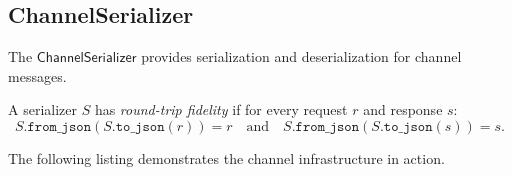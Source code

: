 \documentclass[11pt]{article}
\newcommand{\ChanSer}{\mathsf{ChannelSerializer}}
\begin{document}
\subsection{ChannelSerializer}
\label{sec:infra:serializer}

The $\ChanSer$ provides serialization and deserialization for
channel messages.

\begin{definition}
\label{def:round-trip}
A serializer $S$ has \emph{round-trip fidelity} if for every
request $r$ and response $s$:
\[
  S.\texttt{from\_json}(S.\texttt{to\_json}(r)) = r
  \quad\text{and}\quad
  S.\texttt{from\_json}(S.\texttt{to\_json}(s)) = s.
\]
\end{definition}

The following listing demonstrates the channel infrastructure
in action.
\end{document}
